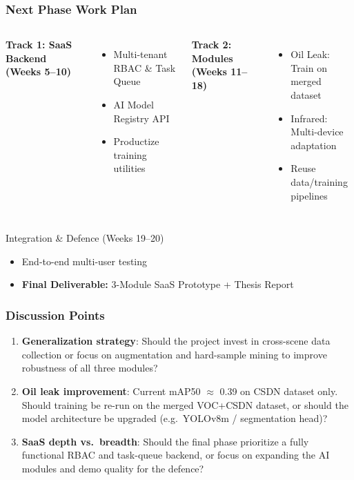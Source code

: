 \documentclass[aspectratio=169]{beamer}
\begin{document}
\begin{frame}
\frametitle{Next Phase Work Plan}
\vspace{-5pt}
\begin{columns}[T]
\textbf{Track 1: SaaS Backend (Weeks 5--10)}
\begin{itemize}
  \item Multi-tenant RBAC \& Task Queue
  \item AI Model Registry API
  \item Productize training utilities
\end{itemize}

\textbf{Track 2: Modules (Weeks 11--18)}
\begin{itemize}
  \item Oil Leak: Train on merged dataset
  \item Infrared: Multi-device adaptation
  \item Reuse data/training pipelines
\end{itemize}
\end{columns}
\vspace{8pt}
\begin{block}{Integration \& Defence (Weeks 19--20)}
\begin{itemize}
  \item End-to-end multi-user testing
  \item \textbf{Final Deliverable:} 3-Module SaaS Prototype + Thesis Report
\end{itemize}
\end{block}
\end{frame}

\begin{frame}
\frametitle{Discussion Points}
\vspace{-5pt}
\begin{enumerate}
  \item \textbf{Generalization strategy}: Should the project invest in cross-scene data collection or focus on augmentation and hard-sample mining to improve robustness of all three modules?
  \item \textbf{Oil leak improvement}: Current mAP50 $\approx$ 0.39 on CSDN dataset only. Should training be re-run on the merged VOC+CSDN dataset, or should the model architecture be upgraded (e.g.\ YOLOv8m / segmentation head)?
  \item \textbf{SaaS depth vs.\ breadth}: Should the final phase prioritize a fully functional RBAC and task-queue backend, or focus on expanding the AI modules and demo quality for the defence?
\end{enumerate}
\end{frame}
\end{document}
